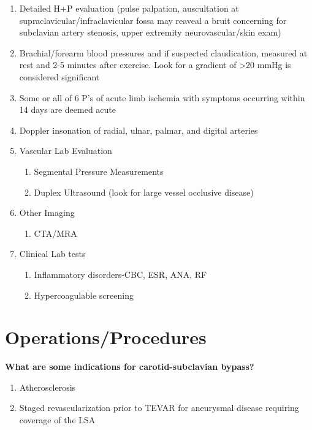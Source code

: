 \documentclass[
]{book}
\providecommand{\tightlist}{%
  \setlength{\itemsep}{0pt}\setlength{\parskip}{0pt}}
\begin{document}
\begin{enumerate}
\def\labelenumi{\arabic{enumi}.}
\item
  Detailed H+P evaluation (pulse palpation, auscultation at
  supraclavicular/infraclavicular fossa may reaveal a bruit concerning
  for subclavian artery stenosis, upper extremity neurovascular/skin
  exam)
\item
  Brachial/forearm blood pressures and if suspected claudication,
  measured at rest and 2-5 minutes after exercise. Look for a gradient
  of \textgreater20 mmHg is considered significant
\item
  Some or all of 6 P's of acute limb ischemia with symptoms occurring
  within 14 days are deemed acute
\item
  Doppler insonation of radial, ulnar, palmar, and digital arteries
\item
  Vascular Lab Evaluation

  \begin{enumerate}
  \def\labelenumii{\arabic{enumii}.}
  \item
    Segmental Pressure Measurements
  \item
    Duplex Ultrasound (look for large vessel occlusive disease)
  \end{enumerate}
\item
  Other Imaging

  \begin{enumerate}
  \def\labelenumii{\arabic{enumii}.}
  \tightlist
  \item
    CTA/MRA
  \end{enumerate}
\item
  Clinical Lab tests

  \begin{enumerate}
  \def\labelenumii{\arabic{enumii}.}
  \item
    Inflammatory disorders-CBC, ESR, ANA, RF
  \item
    Hypercoagulable screening
  \end{enumerate}
\end{enumerate}

\hypertarget{operationsprocedures}{%
\section{Operations/Procedures}\label{operationsprocedures}}

\textbf{What are some indications for carotid-subclavian bypass?}

\begin{enumerate}
\def\labelenumi{\arabic{enumi}.}
\item
  Atherosclerosis
\item
  Staged revascularization prior to TEVAR for aneurysmal disease
  requiring coverage of the LSA
\end{enumerate}
\end{document}
